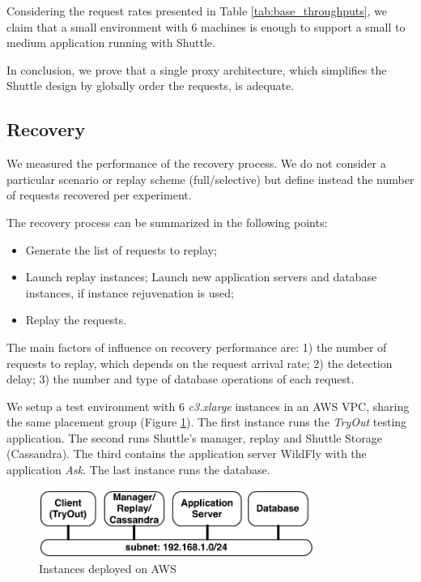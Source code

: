 Considering the request rates presented in Table \ref{tab:base_throughputs}, we claim that a small environment with 6 machines is enough to support a small to medium application running with Shuttle. 

In conclusion, we prove that a single proxy architecture, which simplifies the Shuttle design by globally order the requests, is adequate. 






\subsection{Recovery}\label{sec:eval:recovery}
We measured the performance of the recovery process. We do not consider a particular scenario or replay scheme (full/selective) but define instead the number of requests recovered per experiment.

The recovery process can be summarized in the following points:

\begin{itemize}
  \item Generate the list of requests to replay;
  \item Launch replay instances; Launch new application servers and database instances, if instance rejuvenation is used;
  \item Replay the requests.
\end{itemize}

The main factors of influence on recovery performance are: 1) the number of requests to replay, which depends on the request arrival rate; 2) the detection delay; 3) the number and type of database operations of each request.


We setup a test environment with 6 \emph{c3.xlarge} instances in an \ac{AWS} \ac{VPC}, sharing the same placement group (Figure \ref{fig:aws_diagram}). The first instance runs the \emph{TryOut} testing application. The second runs Shuttle's manager, replay and Shuttle Storage (Cassandra). The third contains the application server WildFly with the application \emph{Ask}. The last instance runs the database.

\begin{figure}[!htb]
  \centering
  \includegraphics[width=90mm]{images/aws_diagram}
  \caption{Instances deployed on \ac{AWS} }
  \label{fig:aws_diagram}
\end{figure}


